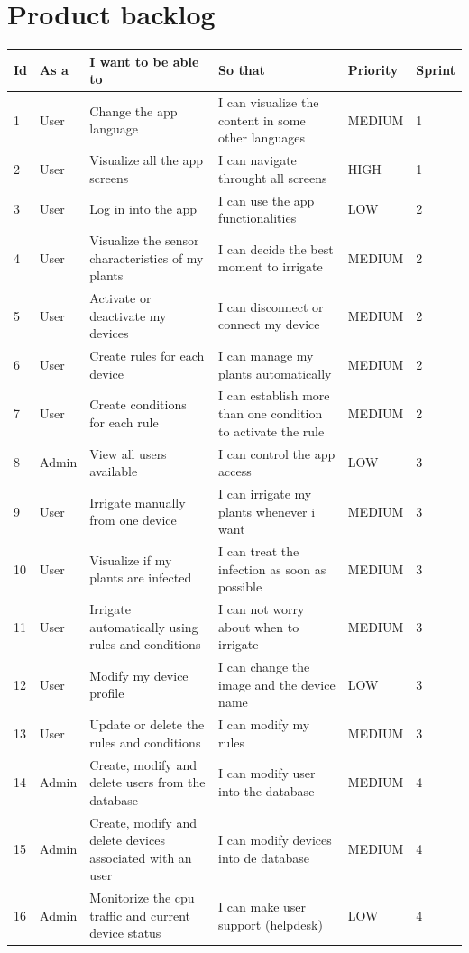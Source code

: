 \documentclass[11pt,a4paper]{article}
\begin{document}
\section{Product backlog}
\begin{center}
\begin{adjustbox}{angle=90,width=2.9in}
\begin{tabular}{|l|l|l|l|l|l|}
\hline
\textbf{Id} & \textbf{As a} & \textbf{I want to be able to} & \textbf{So that} & \textbf{Priority} & \textbf{Sprint} \\
\hline \hline
1 & User & Change the app language & I can visualize the content in some other languages & MEDIUM & 1 \\
\hline
2 & User & Visualize all the app screens & I can navigate throught all screens & HIGH & 1 \\
\hline
3 & User & Log in into the app & I can use the app functionalities & LOW & 2 \\
\hline
4 & User & Visualize the sensor characteristics of my plants & I can decide the best moment to irrigate & MEDIUM & 2 \\
\hline
5 & User & Activate or deactivate my devices & I can disconnect or connect my device & MEDIUM & 2 \\
\hline
6 & User & Create rules for each device & I can manage my plants automatically & MEDIUM & 2 \\
\hline
7 & User & Create conditions for each rule & I can establish more than one condition to activate the rule & MEDIUM & 2 \\
\hline
8 & Admin & View all users available & I can control the app access & LOW & 3 \\
\hline
9 & User & Irrigate manually from one device & I can irrigate my plants whenever i want & MEDIUM & 3 \\
\hline
10 & User & Visualize if my plants are infected & I can treat the infection as soon as possible & MEDIUM & 3 \\
\hline
11 & User & Irrigate automatically using rules and conditions & I can not worry about when to irrigate & MEDIUM & 3 \\
\hline
12 & User & Modify my device profile & I can change the image and the device name & LOW & 3 \\
\hline
13 & User & Update or delete the rules and conditions & I can modify my rules & MEDIUM & 3 \\
\hline
14 & Admin & Create, modify and delete users from the database & I can modify user into the database & MEDIUM & 4 \\
\hline
15 & Admin & Create, modify and delete devices associated with an user & I can modify devices into de database & MEDIUM & 4 \\
\hline
16 & Admin & Monitorize the cpu traffic and current device status & I can make user support (helpdesk) & LOW & 4 \\
\hline
\end{tabular}
\end{adjustbox}
\end{center}
\end{document}
